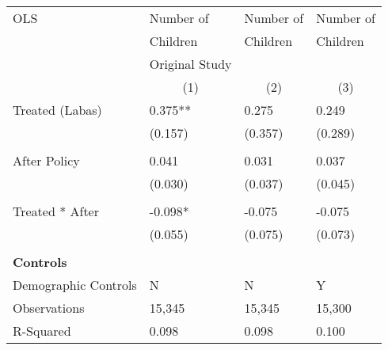 \begin{tabular}{p{4cm}p{1.5cm}p{1.5cm}p{1.5cm}}
\hline\hline
OLS               &Number of & Number of &Number of \\
&Children & Children & Children\\
&Original Study & &  \\
&\multicolumn{1}{c}{(1)}&\multicolumn{1}{c}{(2)}&\multicolumn{1}{c}{(3)}\\
\hline
Treated (Labas)   &  0.375**&   0.275 & 0.249 \\
                &  (0.157)&  (0.357) & (0.289)\\
                \\
After Policy   &   0.041&   0.031 &0.037\\
                &  (0.030)&  (0.037) & (0.045)\\
                \\
Treated * After   & -0.098*&  -0.075 & -0.075\\
                &  (0.055)&  (0.075) &(0.073)\\
                \\

\multicolumn{6}{l}{\textbf{Controls}}  \\                  
Demographic Controls       &   N     &        N&        Y\\

\hline
Observations    &    15,345&    15,345 & 15,300\\
R-Squared    &  0.098   & 0.098 & 0.100     \\
\hline\hline
\end{tabular}